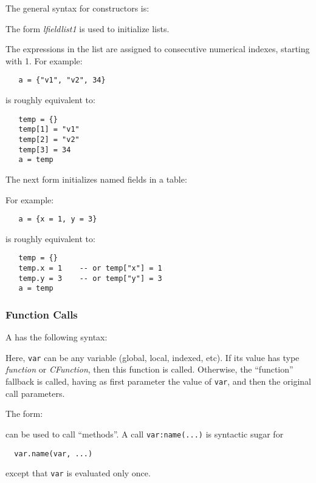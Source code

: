 The general syntax for constructors is:
\begin{Produc}
\end{Produc}

The form {\em lfieldlist1} is used to initialize lists.
\begin{Produc}
\end{Produc}%
The expressions in the list are assigned to consecutive numerical indexes,
starting with 1.
For example:
\begin{verbatim}
   a = {"v1", "v2", 34}
\end{verbatim}
is roughly equivalent to:
\begin{verbatim}
   temp = {}
   temp[1] = "v1"
   temp[2] = "v2"
   temp[3] = 34
   a = temp
\end{verbatim}

The next form initializes named fields in a table:
\begin{Produc}
\end{Produc}%
For example:
\begin{verbatim}
   a = {x = 1, y = 3}
\end{verbatim}
is roughly equivalent to:
\begin{verbatim}
   temp = {}
   temp.x = 1    -- or temp["x"] = 1
   temp.y = 3    -- or temp["y"] = 3
   a = temp
\end{verbatim}


\subsubsection{Function Calls}  \label{functioncall}
A  has the following syntax:
\begin{Produc}
\end{Produc}%
Here, \verb'var' can be any variable (global, local, indexed, etc).
If its value has type {\em function\/} or {\em CFunction\/},
then this function is called.
Otherwise, the ``function'' fallback is called,
having as first parameter the value of \verb'var',
and then the original call parameters.

The form:
\begin{Produc}
\end{Produc}%
can be used to call ``methods''.
A call \verb'var:name(...)'
is syntactic sugar for
\begin{verbatim}
  var.name(var, ...)
\end{verbatim}
except that \verb'var' is evaluated only once.

